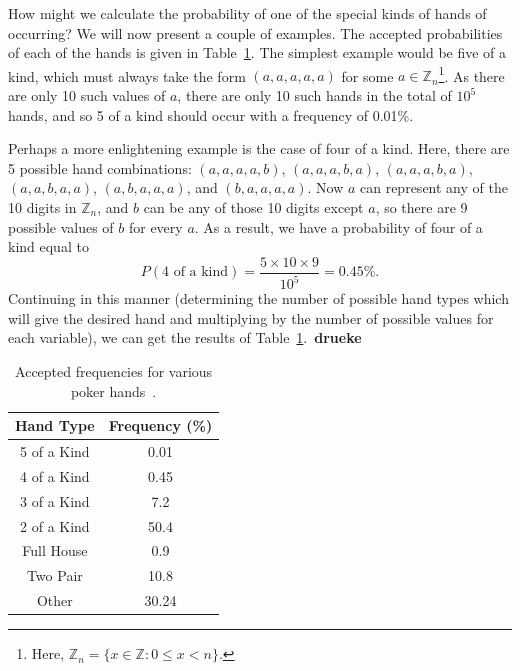 \documentclass[12pt]{article}
\numberwithin{equation}{section}
\begin{document}
\par How might we calculate the probability of one of the special kinds of hands of occurring?  We will now present a couple of examples.  The accepted probabilities of each of the hands is given in Table~\ref{tab:pokeracc}.  The simplest example would be five of a kind, which must always take the form $(a,a,a,a,a)$ for some $a\in\mathbb{Z}_{n}$\footnote{Here, $\mathbb{Z}_{n}=\{x\in\mathbb{Z}:0\leq x < n\}$.}.  As there are only 10 such values of $a$, there are only 10 such hands in the total of $10^{5}$ hands, and so 5 of a kind should occur with a frequency of 0.01\%.
\par Perhaps a more enlightening example is the case of four of a kind.  Here, there are 5 possible hand combinations: $(a,a,a,a,b)$, $(a,a,a,b,a)$, $(a,a,a,b,a)$, $(a,a,b,a,a)$, $(a,b,a,a,a)$, and $(b,a,a,a,a)$.  Now $a$ can represent any of the 10 digits in $\mathbb{Z}_{n}$, and $b$ can be any of those 10 digits except $a$, so there are 9 possible values of $b$ for every $a$.  As a result, we have a probability of four of a kind equal to 
$$
P(\text{4 of a kind}) = \frac{5\times10\times9}{10^{5}} = 0.45\%.
$$
Continuing in this manner (determining the number of possible hand types which will give the desired hand and multiplying by the number of possible values for each variable), we can get the results of Table~\ref{tab:pokeracc}.~\textbf{drueke}

\begin{table}[ht]
\begin{center}
\begin{tabular}{c|c} \hline
	Hand Type & Frequency (\%) \\ \hline
    5 of a Kind & 0.01\\
    4 of a Kind & 0.45\\
    3 of a Kind & 7.2\\
    2 of a Kind & 50.4\\
    Full House & 0.9\\
    Two Pair & 10.8\\ 
    Other & 30.24\\ \hline
\end{tabular}
\caption{Accepted frequencies for various poker hands~\cite{babington}.}
\label{tab:pokeracc}
\end{center}
\end{table}
\end{document}
